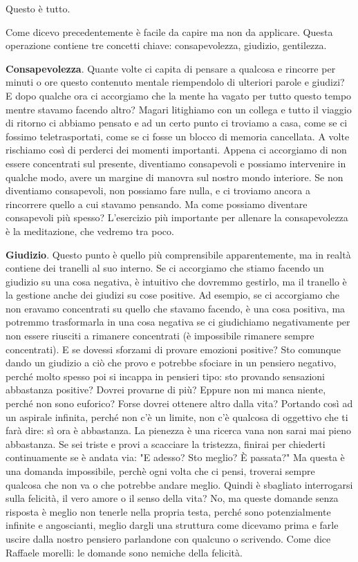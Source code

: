 \documentclass[12pt]{book} %
\begin{document}
Questo è tutto.

Come dicevo precedentemente è facile da capire ma non da applicare. Questa operazione contiene tre concetti chiave:
consapevolezza, giudizio, gentilezza.

\textbf{Consapevolezza}. Quante volte ci capita di pensare a qualcosa e rincorre per minuti o ore questo contenuto mentale
riempendolo di ulteriori parole e giudizi? E dopo qualche ora ci accorgiamo che la mente ha vagato per tutto questo
tempo mentre stavamo facendo altro? Magari litighiamo con un collega e tutto il viaggio di ritorno ci abbiamo pensato e
ad un certo punto ci troviamo a casa, come se ci fossimo teletrasportati, come se ci fosse un blocco di memoria
cancellata. A volte rischiamo così di perderci dei momenti importanti. Appena ci accorgiamo di non essere concentrati
sul presente, diventiamo consapevoli e possiamo intervenire in qualche modo, avere un margine di manovra sul nostro
mondo interiore. Se non diventiamo consapevoli, non possiamo fare nulla, e ci troviamo ancora a rincorrere quello a cui
stavamo pensando. Ma come possiamo diventare consapevoli più spesso? L'esercizio più importante
per allenare la consapevolezza è la meditazione, che vedremo tra poco.

\textbf{Giudizio}. Questo punto è quello più comprensibile apparentemente, ma in realtà contiene dei tranelli al suo interno. Se
ci accorgiamo che stiamo facendo un giudizio su una cosa negativa, è intuitivo che dovremmo gestirlo, ma il tranello è
la gestione anche dei giudizi su cose positive. Ad esempio, se ci accorgiamo che non eravamo concentrati su quello che
stavamo facendo, è una cosa positiva, ma potremmo trasformarla in una cosa negativa se ci giudichiamo negativamente per
non essere riusciti a rimanere concentrati (è impossibile rimanere sempre concentrati). E se dovessi sforzami di
provare emozioni positive? Sto comunque dando un giudizio a ciò che provo e potrebbe sfociare in un pensiero negativo,
perché molto spesso poi si incappa in pensieri tipo: sto provando sensazioni abbastanza positive? Dovrei provarne di
più? Eppure non mi manca niente, perché non sono euforico? Forse dovrei ottenere altro dalla vita? Portando così ad un
aspirale infinita, perché non c'è un limite, non c'è qualcosa di oggettivo che ti farà dire: sì ora è abbastanza. La
pienezza è una ricerca vana non sarai mai pieno abbastanza. 
Se sei triste e provi a scacciare la tristezza, finirai per chiederti continuamente se è andata via: "E adesso? Sto meglio? È passata?" Ma questa è una domanda impossibile, perchè ogni volta che ci pensi, troverai sempre qualcosa che non va o che potrebbe andare meglio.
Quindi è sbagliato interrogarsi sulla felicità, il vero
amore o il senso della vita? No, ma queste domande senza risposta è meglio non tenerle nella propria testa, perché sono
potenzialmente infinite e angoscianti, meglio dargli una struttura come dicevamo prima e farle uscire dalla nostro
pensiero parlandone con qualcuno o scrivendo. 
Come dice Raffaele morelli: le domande sono nemiche della felicità.
\end{document}
